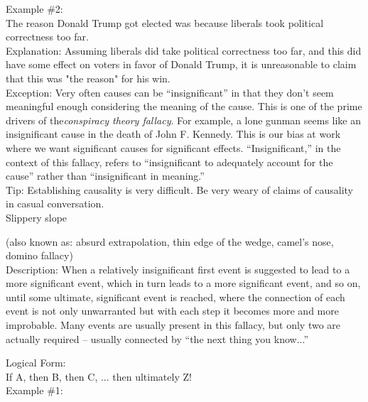 \documentclass[a4paper,12pt,single,pdftex]{scrartcl}
\begin{document}
    
      Example \#2:
    \\

    
      The reason Donald Trump got elected was because liberals took political correctness too far.
    \\

    
      Explanation: Assuming liberals did take political correctness too far, and this did have some effect on voters in favor of Donald Trump, it is unreasonable to claim that this was "the reason" for his win.
    \\

    
      Exception: Very often causes can be “insignificant” in that they don’t seem meaningful enough considering the meaning of the cause. This is one of the prime drivers of the{\em  {\it conspiracy theory}  fallacy}. For example, a lone gunman seems like an insignificant  cause in the death of John F. Kennedy. This is our bias at work where we want significant causes for significant effects. “Insignificant,” in the context of this fallacy, refers to “insignificant to adequately account for the cause” rather than “insignificant in meaning.”
    \\

    
      Tip: Establishing causality is very difficult. Be very weary of claims of causality in casual conversation.
    \\

  

Slippery slope
    
      (also known as: absurd extrapolation, thin edge of the wedge, camel's nose, domino fallacy)
    \\

  
    Description: When a relatively insignificant first event is suggested to lead to a more significant event, which in turn leads to a more significant event, and so on, until some ultimate, significant event is reached, where the connection of each event is not only unwarranted but with each step it becomes more and more improbable.  Many events are usually present in this fallacy, but only two are actually required -- usually connected by “the next thing you know...”

    
      Logical Form:
    \\

    
      If A, then B, then C, ... then ultimately Z!
    \\

    
      Example \#1:
    \\
\end{document}
